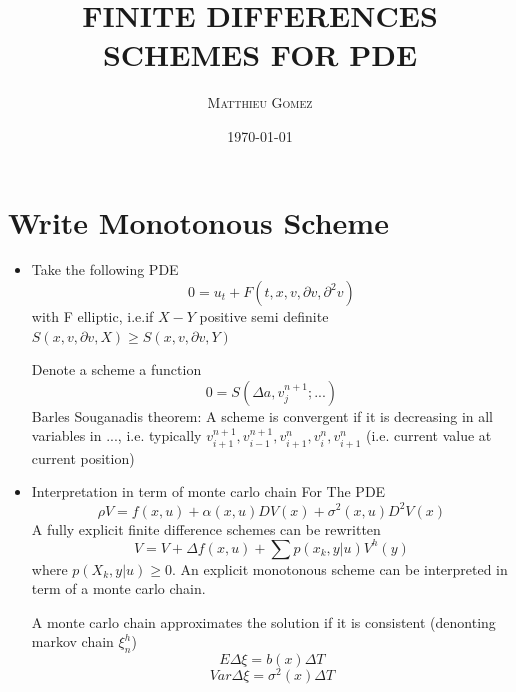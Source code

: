 \documentclass[english]{article}
\begin{document}
\title{\vspace{-4.5ex} \large{\textbf{\MakeUppercase{Finite Differences Schemes for PDE}}}\vspace{1ex}}
\author{\large{\textsc{Matthieu Gomez}}}
\date{\today}
\maketitle
\tableofcontents
\newpage



\section{Write Monotonous Scheme}
\begin{itemize}
	\item 
	Take the following PDE
	$$0 = u_t + F(t, x, v, \partial v, \partial^2 v)$$
	with F elliptic, i.e.if $X - Y$ positive semi definite
	$S(x, v, \partial v, X) \geq S(x, v, \partial v, Y)$


	Denote a scheme a function 
	$$0 = S(\Delta a, v_j^{n+1} ; ...)$$
	Barles Souganadis theorem: A scheme is convergent if it is decreasing in all variables in ..., i.e.  typically $v_{i+1}^{n+1}, v_{i-1}^{n+1}, v_{i+1}^{n}, v_{i}^{n}, v_{i+1}^{n}$  (i.e. current value at current position)
	\item Interpretation in term of  monte carlo chain
	For The PDE
	$$\rho V = f(x, u) + \alpha(x, u) DV(x) + \sigma^2(x, u) D^2 V(x)$$
	A fully explicit finite difference schemes can be rewritten
	$$V =  V + \Delta f(x, u) + \sum p(x_k, y|u)V^h(y) $$
	where $p(X_k, y|u) \geq 0$.  An explicit monotonous scheme can be interpreted in term of a monte carlo chain.

	A monte carlo chain approximates the solution if it is consistent (denonting markov chain $\xi^h_n$)
	$$E\Delta \xi = b(x) \Delta T$$
	$$Var\Delta \xi = \sigma^2 (x) \Delta T$$
\end{itemize}
\end{document}
